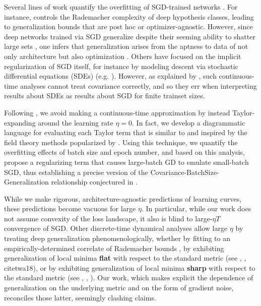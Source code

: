 \documentclass{article}
\begin{document}
    Several lines of work quantify the overfitting of SGD-trained networks
    \citep{ne17a}.  For instance, \citet{ba17} controls the Rademacher
    complexity of deep hypothesis classes, leading to generalization bounds
    that are post hoc or optimizer-agnostic.  However, since deep networks
    trained via SGD generalize despite their seeming ability to shatter large
    sets \citep{zh17}, one infers that generalization arises from the aptness
    to data of not only architecture but also optimization \citep{ne17b}.
    Others have focused on the implicit regularization of SGD itself, for
    instance by modeling descent via stochastic differential equations (SDEs)
    (e.g.  \citet{ch18}).  However, as explained by \citet{ya19}, such
    continuous-time analyses cannot treat covariance correctly, and so they err
    when interpreting results about SDEs as results about SGD for finite
    trainset sizes.

    Following \citet{ro18}, we avoid making a continuous-time approximation by
    instead Taylor-expanding around the learning rate $\eta=0$.  In fact, we
    develop a diagrammatic language for evaluating each Taylor term that is
    similar to and inspired by the field theory methods popularized by
    \citet{dy49a}.  Using this technique, we quantify the overfitting effects
    of batch size and epoch number, and based on this analysis, propose a
    regularizing term that causes large-batch GD to emulate small-batch SGD,
    thus establishing a precise version of the
    Covariance-BatchSize-Generalization relationship conjectured in
    \citet{ja18}.  
    
    While we make rigorous, architecture-agnostic predictions of learning
    curves, these predictions become vacuous for large $\eta$.  In particular,
    while our work does not assume convexity of the loss landscape, it also is
    blind to large-$\eta T$ convergence of SGD.  Other discrete-time dynamical
    analyses allow large $\eta$ by treating deep generalization
    phenomenologically, whether by fitting to an empirically-determined
    correlate of Rademacher bounds \citep{li18}, by exhibiting generalization
    of local minima {\bf flat} with respect to the standard metric (see
    \citet{ho17}, \citet{ke17}, citet{wa18}), or by exhibiting generalization
    of local minima {\bf sharp} with respect to the standard metric (see
    \citet{st56}, \citet{di17}, \citet{wu18}).  Our work, which makes explicit
    the dependence of generalization on the underlying metric and on the form
    of gradient noise, reconciles those latter, seemingly clashing claims.
    
\end{document}
